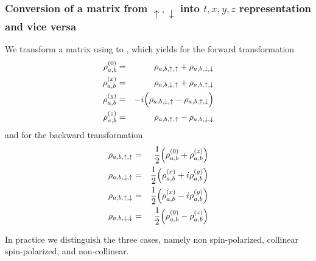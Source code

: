 \documentclass[11pt,a4paper]{report}
\begin{document}
\subsubsection{Conversion of a matrix from $\uparrow,\downarrow$ 
into $t,x,y,z$ representation and vice versa}
We transform a matrix using
to , which yields for the
forward transformation
\begin{eqnarray}
\rho^{(0)}_{a,b}&=&\rho_{a,b,\uparrow,\uparrow}+\rho_{a,b,\downarrow,\downarrow}
\nonumber\\
\rho^{(x)}_{a,b}&=&\rho_{a,b,\downarrow,\uparrow}+\rho_{a,b,\uparrow,\downarrow}
\nonumber\\
\rho^{(y)}_{a,b}&=&-i
\Bigl(\rho_{a,b,\downarrow,\uparrow}-\rho_{a,b,\uparrow,\downarrow}\Bigr)
\nonumber\\
\rho^{(z)}_{a,b}&=&\rho_{a,b,\uparrow,\uparrow}-\rho_{a,b,\downarrow,\downarrow}
\label{eq:defdensitymatrixforwardexplicit}
\end{eqnarray}
and for the backward transformation
\begin{eqnarray}
\rho_{a,b,\uparrow,\uparrow}&=&\frac{1}{2}\Bigl(\rho^{(0)}_{a,b}+\rho^{(z)}_{a,b}\Bigr)
\nonumber\\
\rho_{a,b,\downarrow,\uparrow}&=&\frac{1}{2}\Bigl(\rho^{(x)}_{a,b}+i\rho^{(y)}_{a,b}\Bigr)
\nonumber\\
\rho_{a,b,\uparrow,\downarrow}&=&\frac{1}{2}\Bigl(\rho^{(x)}_{a,b}-i\rho^{(y)}_{a,b}\Bigr)
\nonumber\\
\rho_{a,b,\downarrow,\downarrow}&=&\frac{1}{2}\Bigl(\rho^{(0)}_{a,b}-\rho^{(z)}_{a,b}\Bigr)
\label{eq:defdensitymatrixbackexplicit}
\end{eqnarray}

In practice we distinguish the three cases, namely non spin-polarized,
collinear spin-polarized, and non-collinear.
\end{document}
